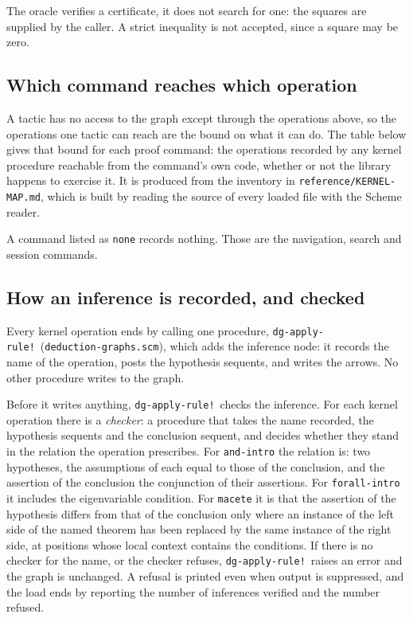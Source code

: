 The oracle verifies a certificate, it does not search for one: the
squares are supplied by the caller.  A strict inequality is not accepted,
since a square may be zero.

\subsection{Which command reaches which operation}\label{sec:command-uses}

A tactic has no access to the graph except through the operations above,
so the operations one tactic can reach are the bound on what it can do.
The table below gives that bound for each proof command: the operations
recorded by any kernel procedure reachable from the command's own code,
whether or not the library happens to exercise it.  It is produced from
the inventory in \texttt{reference/KERNEL-MAP.md}, which is built by
reading the source of every loaded file with the Scheme reader.

A command listed as \texttt{none} records nothing.  Those are the
navigation, search and session commands.


\VNBtacticusestable

\subsection{How an inference is recorded, and checked}\label{sec:inference-checked}

Every kernel operation ends by calling one procedure,
\texttt{dg-apply-rule!}\ (\texttt{deduction-graphs.scm}), which adds the
inference node: it records the name of the operation, posts the
hypothesis sequents, and writes the arrows.  No other procedure writes to
the graph.

Before it writes anything, \texttt{dg-apply-rule!}\ checks the inference.
For each kernel operation there is a \emph{checker}: a procedure that
takes the name recorded, the hypothesis sequents and the conclusion
sequent, and decides whether they stand in the relation the operation
prescribes.  For \texttt{and-intro} the relation is: two hypotheses, the
assumptions of each equal to those of the conclusion, and the assertion
of the conclusion the conjunction of their assertions.  For
\texttt{forall-intro} it includes the eigenvariable condition.  For
\texttt{macete} it is that the assertion of the hypothesis differs from
that of the conclusion only where an instance of the left side of the
named theorem has been replaced by the same instance of the right side,
at positions whose local context contains the conditions.  If there is no
checker for the name, or the checker refuses, \texttt{dg-apply-rule!}\
raises an error and the graph is unchanged.  A refusal is printed even
when output is suppressed, and the load ends by reporting the number of
inferences verified and the number refused.

